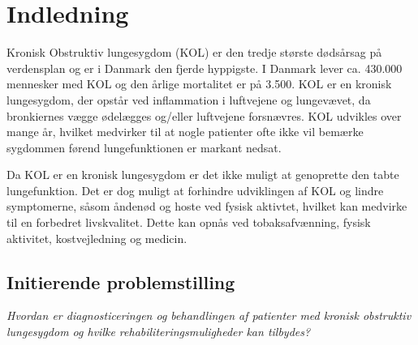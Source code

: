 \chapter{Indledning} 
Kronisk Obstruktiv lungesygdom (KOL) er den tredje største dødsårsag på verdensplan og er i Danmark den fjerde hyppigste. I Danmark lever ca. 430.000 mennesker med KOL og den årlige mortalitet er på 3.500. KOL er en kronisk lungesygdom, der opstår ved inflammation i luftvejene og lungevævet, da bronkiernes vægge ødelægges og/eller luftvejene forsnævres. KOL udvikles over mange år, hvilket medvirker til at nogle patienter ofte ikke vil bemærke sygdommen førend lungefunktionen er markant nedsat. 


Da KOL er en kronisk lungesygdom er det ikke muligt at genoprette den tabte lungefunktion. Det er dog muligt at forhindre udviklingen af KOL og lindre symptomerne, såsom åndenød og hoste ved fysisk aktivtet, hvilket kan medvirke til en forbedret livskvalitet. Dette kan opnås ved tobaksafvænning, fysisk aktivitet, kostvejledning og medicin. 






\section{Initierende problemstilling}
\textit{Hvordan er diagnosticeringen og behandlingen af patienter med kronisk obstruktiv lungesygdom og hvilke rehabiliteringsmuligheder kan tilbydes?}